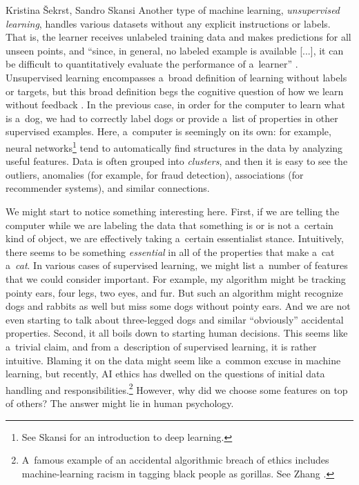 \begin{artengenv2auth}{Kristina Šekrst, Sandro Skansi}
Another type of machine learning, \textit{unsupervised learning}, handles various datasets without any explicit instructions or labels. That is, the learner receives unlabeled training data and makes predictions for all unseen points, and ``since, in general, no labeled example is available [...], it can be difficult to quantitatively evaluate the performance of a~learner''
\parencite[][p.7]{mohri_foundations_2018}. %
 Unsupervised learning encompasses a~broad definition of learning without labels or targets, but this broad definition begs the cognitive question of how we learn without feedback 
\parencite[][p.70]{skansi_introduction_2018}. %
 In the previous case, in order for the computer to learn what is a~dog, we had to correctly label dogs or provide a~list of properties in other supervised examples. Here, a~computer is seemingly on its own: for example, neural networks\footnote{See Skansi 
\parencite*[][]{skansi_introduction_2018} %
 for an introduction to deep learning.} tend to automatically find structures in the data by analyzing useful features. Data is often grouped into \textit{clusters}, and then it is easy to see the outliers, anomalies (for example, for fraud detection), associations (for recommender systems), and similar connections.

We might start to notice something interesting here. First, if we are telling the computer while we are labeling the data that something is or is not a~certain kind of object, we are effectively taking a~certain essentialist stance. Intuitively, there seems to be something \textit{essential} in all of the properties that make a~cat a~\textit{cat}. In various cases of supervised learning, we might list a~number of features that we could consider important. For example, my algorithm might be tracking pointy ears, four legs, two eyes, and fur. But such an algorithm might recognize dogs and rabbits as well but miss some dogs without pointy ears. And we are not even starting to talk about three-legged dogs and similar ``obviously'' accidental properties. Second, it all boils down to starting human decisions. This seems like a~trivial claim, and from a~description of supervised learning, it is rather intuitive. Blaming it on the data might seem like a~common excuse in machine learning, but recently, AI ethics has dwelled on the questions of initial data handling and responsibilities.\footnote{A~famous example of an accidental algorithmic breach of ethics includes machine-learning racism in tagging black people as gorillas. See Zhang
\parencite*[][]{zhang_google_2015}.%
} However, why did we choose some features on top of others? The answer might lie in human psychology.


\end{artengenv2auth}
